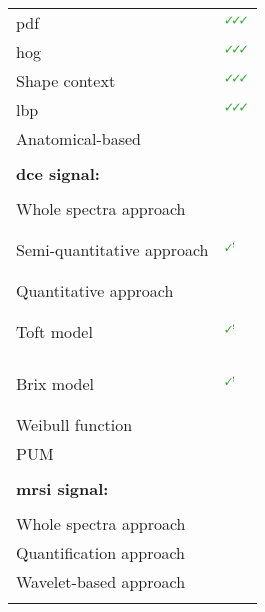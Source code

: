 \begin{table*}
\begin{threeparttable}
\begin{tabular}{p{.5\linewidth} p{.4\linewidth}}
      \quad \quad \quad \acs{pdf} & $^{\text{{\cmarksmall}{\cmarksmall}{\cmarksmall}}}$\cite{Liu2013} \\
      \quad \quad \quad \acs{hog} & $^{\text{{\cmarksmall}{\cmarksmall}{\cmarksmall}}}$\cite{Liu2013} \\
      \quad \quad \quad Shape context & $^{\text{{\cmarksmall}{\cmarksmall}{\cmarksmall}}}$\cite{Liu2013} \\
      \quad \quad \quad \acs{lbp} & $^{\text{{\cmarksmall}{\cmarksmall}{\cmarksmall}}}$\cite{Liu2013} \\
      \quad \quad Anatomical-based & \cite{Litjens2012,Litjens2014,Matulewicz2013} \\ \\ [-1.5ex]
      \textbf{\ac{dce} signal:} & \\ \\ [-1.5ex]
      \quad Whole spectra approach & \cite{Ampeliotis2007,Ampeliotis2008} \\
      \quad Semi-quantitative approach & $^{\text{{\mmarksmall}}}$\cite{Puech2009}\par \cite{Mazzetti2011,Niaf2011,Niaf2012,Sung2011} \\
      \quad Quantitative approach &  \\
      \quad \quad Toft model & $^{\text{{\mmarksmall}}}$\cite{Liu2013,Peng2009}\par \cite{Giannini2013,Langer2009,Litjens2011,Litjens2012,Litjens2014,Mazzetti2011,Niaf2011,Niaf2012} \\
      \quad \quad Brix model & $^{\text{{\mmarksmall}}}$\cite{Artan2009,Artan2010,Ozer2009,Ozer2010}\par \cite{Liu2009,Sung2011} \\
      \quad \quad Weibull function & \cite{Giannini2013,Mazzetti2011} \\
      \quad \quad PUM & \cite{Giannini2013,Mazzetti2011} \\
      \\ [-1.5ex]
      \textbf{\ac{mrsi} signal:} & \\ \\ [-1.5ex]
      \quad Whole spectra approach & \cite{Kelm2007,Matulewicz2013,Parfait2012,Tiwari2007,Tiwari2008,Tiwari2009,Tiwari2009a,Tiwari2010,Tiwari2013,Viswanath2008} \\
      \quad Quantification approach & \cite{Kelm2007,Parfait2012} \\
      \quad Wavelet-based approach & \cite{Tiwari2012} \\ \\ [-1.5ex]

\end{tabular}
\end{threeparttable}
\end{table*}

